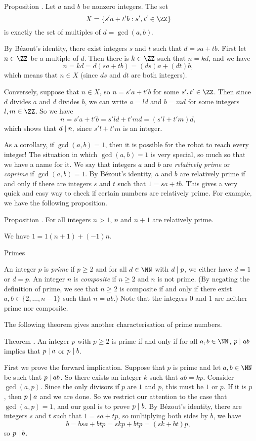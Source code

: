 \proclaim Proposition \advthm. Let $a$ and $b$ be nonzero integers. The set
$$X = \{ s'a + t'b : s',t'\in \ZZ\}$$
is exactly the set of multiples of $d = \gcd(a,b)$.

\proof By B\'ezout's identity, there exist integers $s$ and $t$ such that $d = sa+tb$.
First let $n\in \ZZ$ be a multiple of $d$. Then there is $k\in \ZZ$ such that $n=kd$,
and we have
$$ n = kd = d(sa+tb) = (ds)a + (dt)b,$$
which means that $n\in X$ (since $ds$ and $dt$ are both integers).

Conversely, suppose that $n\in X$, so $n = s'a + t'b$ for some $s',t'\in \ZZ$. Then since
$d$ divides $a$ and $d$ divides $b$, we can write $a = ld$ and $b=md$ for some integers $l,m\in \ZZ$.
So we have
$$ n= s'a + t'b = s'ld + t'md = (s'l+t'm)d,$$
which shows that $d\mid n$, since $s'l+t'm$ is an integer.\slug

As a corollary, if $\gcd(a,b) = 1$, then it is possible for the robot to reach every integer!
The situation in which $\gcd(a,b) = 1$ is very special, so much so that we have a name for it.
We say that integers $a$ and $b$ are {\it relatively prime} or {\it coprime} if $\gcd(a,b) = 1$.
By B\'ezout's identity, $a$ and $b$ are relatively prime if and only if
there are integers $s$ and $t$ such that $1 = sa + tb$. This gives a very quick and easy way to
check if certain numbers are relatively prime. For example, we have the following proposition.

\proclaim Proposition \advthm. For all integers $n>1$, $n$ and $n+1$ are relatively prime.

\proof We have $1= 1(n+1) + (-1)n$.\slug

\advsect Primes

An integer $p$ is {\it prime} if $p\ge 2$ and for all $d\in \NN$ with $d\mid p$,
we either have $d=1$ or $d = p$. An integer $n$ is {\it composite}
if $n\ge 2$ and $n$ is not prime. (By negating the definition of prime, we
see that $n\ge 2$ is composite if and only if there exist $a,b\in \{2,\ldots,n-1\}$ such that
$n = ab$.) Note that the integers $0$ and $1$ are neither prime nor composite.

The following theorem gives another characterisation of prime numbers.

\edef\thmpdivides{\the\thmcount}
\proclaim Theorem \advthm. An integer $p$ with $p\ge 2$ is prime if and only if
for all $a,b\in \NN$, $p\mid ab$ implies that $p\mid a$ or $p\mid b$.

\proof First we prove the forward implication.
Suppose that $p$ is prime and let $a,b\in \NN$ be such that $p\mid ab$. So
there exists an integer $k$ such that $ab = kp$.
Consider $\gcd(a,p)$. Since the
only divisors if $p$ are $1$ and $p$, this must be $1$ or $p$. If it is $p$,
then $p\mid a$ and we are done. So we restrict our attention to the case that
$\gcd(a,p) =1$, and our goal is to prove $p\mid b$. By B\'ezout's identity,
there are integers $s$ and $t$ such that $1= sa+tp$, so multiplying both sides by $b$,
we have
$$ b =bsa+btp = skp + btp = (sk+bt)p,$$
so $p\mid b$.

